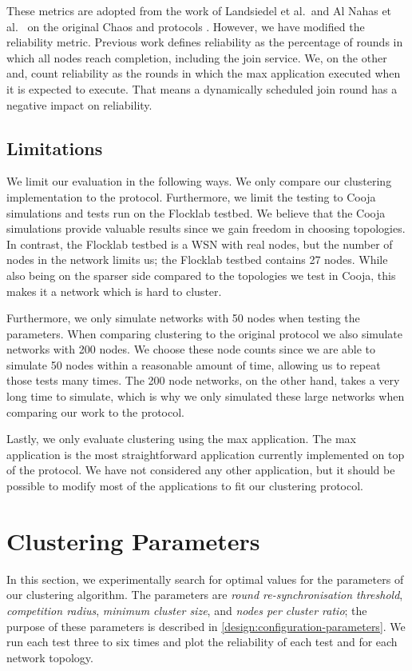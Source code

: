 These metrics are adopted from the work of Landsiedel et al.~and Al Nahas et al.~ on the original Chaos and \atwo{} protocols \cite{chaos-introduction-paper, a2-introduction-paper}. However, we have modified the reliability metric. Previous work defines reliability as the percentage of rounds in which all nodes reach completion, including the join service. We, on the other and, count reliability as the rounds in which the max application executed when it is expected to execute. That means a dynamically scheduled join round has a negative impact on reliability.

\subsection{Limitations}
We limit our evaluation in the following ways. We only compare our clustering implementation to the \atwo{} protocol. Furthermore, we limit the testing to Cooja simulations and tests run on the Flocklab testbed. We believe that the Cooja simulations provide valuable results since we gain freedom in choosing topologies. In contrast, the Flocklab testbed is a WSN with real nodes, but the number of nodes in the network limits us; the Flocklab testbed contains 27 nodes. While also being on the sparser side compared to the topologies we test in Cooja, this makes it a network which is hard to cluster.

Furthermore, we only simulate networks with 50 nodes when testing the parameters. When comparing clustering to the original \atwo{} protocol we also simulate networks with 200 nodes. We choose these node counts since we are able to simulate 50 nodes within a reasonable amount of time, allowing us to repeat those tests many times. The 200 node networks, on the other hand, takes a very long time to simulate, which is why we only simulated these large networks when comparing our work to the \atwo{} protocol.

Lastly, we only evaluate clustering using the max application. The max application is the most straightforward application currently implemented on top of the \atwo{} protocol. We have not considered any other application, but it should be possible to modify most of the applications to fit our clustering protocol.

\section{Clustering Parameters}
\label{sec:clustering-parameters}
In this section, we experimentally search for optimal values for the parameters of our clustering algorithm. The parameters are \emph{round re-synchronisation threshold}, \emph{competition radius}, \emph{minimum cluster size}, and \emph{nodes per cluster ratio}; the purpose of these parameters is described in \cref{design:configuration-parameters}. We run each test three to six times and plot the reliability of each test and for each network topology.

